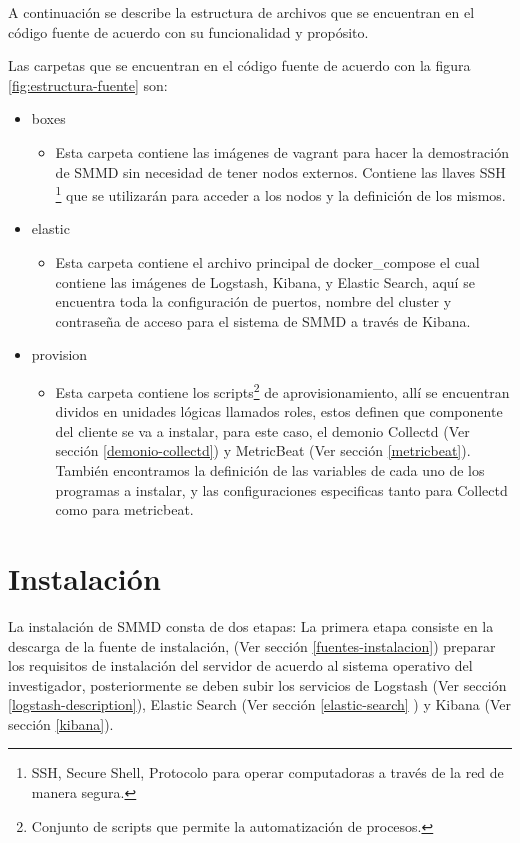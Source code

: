A continuación se describe la estructura de archivos que se encuentran en el código fuente de acuerdo con su funcionalidad y propósito.

\newpage

Las carpetas que se encuentran en el código fuente de acuerdo con la figura \ref{fig:estructura-fuente} son:

\begin{itemize}
	\item boxes
    \begin{itemize}
      \item[] Esta carpeta contiene las imágenes de \gls{vagrant} para hacer la demostración de SMMD sin necesidad de tener nodos externos. Contiene las llaves SSH \footnote{SSH, Secure Shell, Protocolo para operar computadoras a través de la red de manera segura.} que se utilizarán para acceder a los nodos y la definición de los mismos.
    \end{itemize}
    \item elastic
    \begin{itemize}
      \item[] Esta carpeta contiene el archivo principal de \gls{docker_compose} el cual contiene las imágenes de Logstash, Kibana, y Elastic Search, aquí se encuentra toda la configuración de puertos, nombre del cluster y contraseña de acceso para el sistema de SMMD a través de Kibana.
    \end{itemize}
    \item provision
    \begin{itemize}
      \item[] Esta carpeta contiene los scripts\footnote{Conjunto de \gls{script}s que permite la automatización de procesos.} de aprovisionamiento, allí se encuentran dividos en unidades lógicas llamados roles, estos definen que componente del cliente se va a instalar, para este caso, el demonio Collectd (Ver sección \ref{demonio-collectd}) y MetricBeat (Ver sección \ref{metricbeat}). También encontramos la definición de las variables de cada uno de los programas a instalar, y las configuraciones especificas tanto para Collectd como para metricbeat.
    \end{itemize}
\end{itemize}

\section{Instalación}
La instalación de SMMD consta de dos etapas: La primera etapa consiste en la descarga de la fuente de instalación, (Ver sección \ref{fuentes-instalacion}) preparar los requisitos
de instalación del servidor de acuerdo al sistema operativo del investigador, posteriormente se deben subir los servicios de Logstash (Ver sección \ref{logstash-description}), Elastic Search (Ver sección \ref{elastic-search} ) y Kibana (Ver sección \ref{kibana}).


